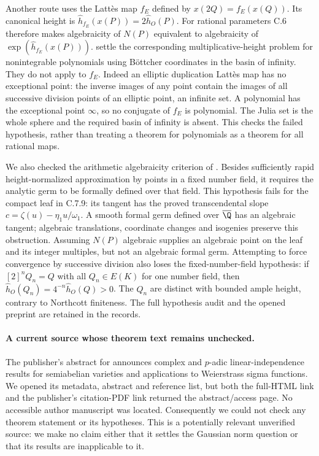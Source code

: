Another route uses the Latt\`es map $f_E$ defined by
$x(2Q)=f_E(x(Q))$. Its canonical height is
$\widehat h_{f_E}(x(P))=2\widehat h_O(P)$. For rational
parameters C.6 therefore makes algebraicity of $N(P)$
equivalent to algebraicity of
$\exp(\widehat h_{f_E}(x(P)))$.
\citet[Theorem 1.4 and Corollary 1.6]{nguyen2023} settle the
corresponding multiplicative-height problem for nonintegrable
polynomials using B\"ottcher coordinates in the basin of
infinity. They do not apply to $f_E$. Indeed an elliptic
duplication Latt\`es map has no exceptional point: the inverse
images of any point contain the images of all successive
division points of an elliptic point, an infinite set. A
polynomial has the exceptional point $\infty$, so no conjugate
of $f_E$ is polynomial. The Julia set is the whole sphere
and the required basin of infinity is absent. This checks
the failed hypothesis, rather than treating a theorem for
polynomials as a theorem for all rational maps.

We also checked the arithmetic algebraicity criterion of
\citet[Theorems 1.3 and 2.3]{xie2024algebraicity}.
Besides sufficiently rapid height-normalized approximation by
points in a fixed number field, it requires the analytic germ
to be formally defined over that field. This hypothesis fails
for the compact leaf in C.7.9: its tangent has the proved
transcendental slope
$c=\zeta(u)-\eta_1u/\omega_1$.
A smooth formal germ defined over $\overline{\Q}$ has an
algebraic tangent; algebraic translations, coordinate changes
and isogenies preserve this obstruction. Assuming $N(P)$
algebraic supplies an algebraic point on the leaf and its
integer multiples, but not an algebraic formal germ. Attempting
to force convergence by successive division also loses the
fixed-number-field hypothesis: if $[2]^nQ_n=Q$ with all
$Q_n\in E(K)$ for one number field, then
$\widehat h_O(Q_n)=4^{-n}\widehat h_O(Q)>0$.
The $Q_n$ are distinct with bounded ample height, contrary to
Northcott finiteness. The full hypothesis audit and the opened
preprint are retained in the records.

\paragraph{A current source whose theorem text remains unchecked.}
The publisher's abstract for \citet{pham2025sigma} announces
complex and $p$-adic linear-independence results for semiabelian
varieties and applications to Weierstrass sigma functions.
We opened its metadata, abstract and reference list, but both
the full-HTML link and the publisher's citation-PDF link returned
the abstract/access page. No accessible author manuscript was
located. Consequently we could not check any theorem statement
or its hypotheses. This is a potentially relevant unverified
source: we make no claim either that it settles the Gaussian
norm question or that its results are inapplicable to it.


